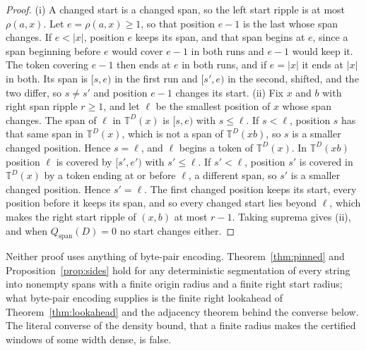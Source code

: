 \documentclass[11pt,a4paper]{article}
\theoremstyle{definition}
\theoremstyle{plain}
\newcommand{\T}{\mathbb{T}}
\begin{document}
\begin{proof}
(i) A changed start is a changed span, so the left start ripple is at most \(\rho(a, x)\). Let \(e = \rho(a, x) \ge 1\),
so that position \(e - 1\) is the last whose span changes. If \(e < |x|\), position \(e\) keeps its span, and that span
begins at \(e\), since a span beginning before \(e\) would cover \(e - 1\) in both runs and \(e - 1\) would keep it. The
token covering \(e - 1\) then ends at \(e\) in both runs, and if \(e = |x|\) it ends at \(|x|\) in both. Its span is
\([s, e)\) in the first run and \([s', e)\) in the second, shifted, and the two differ, so \(s \ne s'\) and position
\(e - 1\) changes its start. (ii) Fix \(x\) and \(b\) with right span ripple \(r \ge 1\), and let \(\ell\) be the
smallest position of \(x\) whose span changes. The span of \(\ell\) in \(\T^D(x)\) is \([s, e)\) with \(s \le \ell\). If
\(s < \ell\), position \(s\) has that same span in \(\T^D(x)\), which is not a span of \(\T^D(xb)\), so \(s\) is a
smaller changed position. Hence \(s = \ell\), and \(\ell\) begins a token of \(\T^D(x)\). In \(\T^D(xb)\) position
\(\ell\) is covered by \([s', e')\) with \(s' \le \ell\). If \(s' < \ell\), position \(s'\) is covered in \(\T^D(x)\) by
a token ending at or before \(\ell\), a different span, so \(s'\) is a smaller changed position. Hence \(s' = \ell\).
The first changed position keeps its start, every position before it keeps its span, and so every changed start lies
beyond \(\ell\), which makes the right start ripple of \((x, b)\) at most \(r - 1\). Taking suprema gives (ii), and when
\(Q_{\mathrm{span}}(D) = 0\) no start changes either.
\end{proof}

Neither proof uses anything of byte-pair encoding. Theorem~\ref{thm:pinned} and Proposition~\ref{prop:sides} hold for
any deterministic segmentation of every string into nonempty spans with a finite origin radius and a finite right start
radius; what byte-pair encoding supplies is the finite right lookahead of Theorem~\ref{thm:lookahead} and the adjacency
theorem behind the converse below. The literal converse of the density bound, that a finite radius makes the certified
windows of some width dense, is false.
\end{document}
